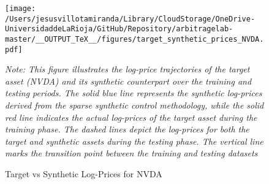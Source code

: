 \begin{figure}[H]
  \caption{Target vs Synthetic Log-Prices for NVDA}
  \centering
  \texttt{[image: /Users/jesusvillotamiranda/Library/CloudStorage/OneDrive-UniversidaddeLaRioja/GitHub/Repository/arbitragelab-master/\_\_OUTPUT\_TeX\_\_/figures/target\_synthetic\_prices\_NVDA.pdf]}
\label{fig:target_synthetic_prices_NVDA}
\vspace{0.5cm}
\begin{minipage}{\textwidth}
\setlength{\parindent}{0pt}
\small\textit{Note: 
This figure illustrates the log-price trajectories of the target asset (NVDA) and its synthetic counterpart over the training and testing periods. The solid blue line represents the synthetic log-prices derived from the sparse synthetic control methodology, while the solid red line indicates the actual log-prices of the target asset during the training phase. The dashed lines depict the log-prices for both the target and synthetic assets during the testing phase. The vertical line marks the transition point between the training and testing datasets
}
\end{minipage}
\end{figure}



